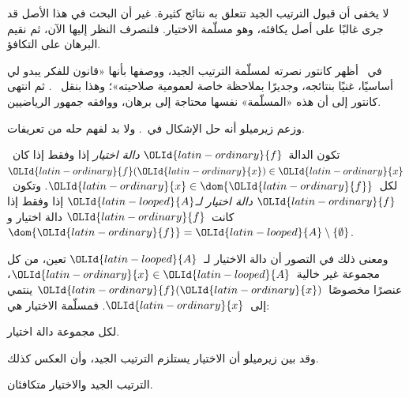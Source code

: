 \documentclass[../../../include/open-logic-section]{subfiles}
\begin{document}

لا يخفى أن قبول الترتيب الجيد تتعلق به نتائج كثيرة. غير أن البحث في
هذا الأصل قد جرى غالبًا على أصل يكافئه، وهو مسلّمة الاختيار. فلنصرف
النظر إليها الآن، ثم نقيم البرهان على التكافؤ.

في~\citeyear{Cantor1883} أظهر كانتور نصرته لمسلّمة الترتيب الجيد،
ووصفها بأنها «قانون للفكر يبدو لي أساسيًا، غنيًا بنتائجه، وجديرًا
بملاحظة خاصة لعمومية صلاحيته»؛ وهذا بنقل~\citeauthor{Potter2004}
\citeyear[p.~243]{Potter2004}. ثم انتهى كانتور إلى أن هذه «المسلّمة»
نفسها محتاجة إلى برهان، ووافقه جمهور الرياضيين.

وزعم زيرميلو أنه حل الإشكال في~\citeyear{Zermelo1904}. ولا بد لفهم
حله من تعريفات.

\begin{defn}
تكون الدالة~${\OLId{latin-ordinary}{f}}$ \emph{دالة اختيار} إذا وفقط إذا كان~${\OLId{latin-ordinary}{f}}({\OLId{latin-ordinary}{x}}) \in {\OLId{latin-ordinary}{x}}$
لكل~${\OLId{latin-ordinary}{x}} \in \dom{{\OLId{latin-ordinary}{f}}}$. وتكون~${\OLId{latin-ordinary}{f}}$ \emph{دالة اختيار لـ${\OLId{latin-looped}{A}}$} إذا وفقط
إذا كانت~${\OLId{latin-ordinary}{f}}$ دالة اختيار و$\dom{{\OLId{latin-ordinary}{f}}} = {\OLId{latin-looped}{A}} \setminus \{\emptyset\}$.
\end{defn}

ومعنى ذلك في التصور أن دالة الاختيار لـ~${\OLId{latin-looped}{A}}$ تعين، من كل مجموعة غير
خالية~${\OLId{latin-ordinary}{x}} \in {\OLId{latin-looped}{A}}$، عنصرًا مخصوصًا~${\OLId{latin-ordinary}{f}}({\OLId{latin-ordinary}{x}})$ ينتمي إلى~${\OLId{latin-ordinary}{x}}$. فمسلّمة
الاختيار هي:

\begin{axiom}[الاختيار]
	لكل مجموعة دالة اختيار.
\end{axiom}

وقد بين زيرميلو أن الاختيار يستلزم الترتيب الجيد، وأن العكس كذلك.

\begin{thm}[في $\ZF$]
الترتيب الجيد والاختيار متكافئان.
\end{thm}
\end{document}
